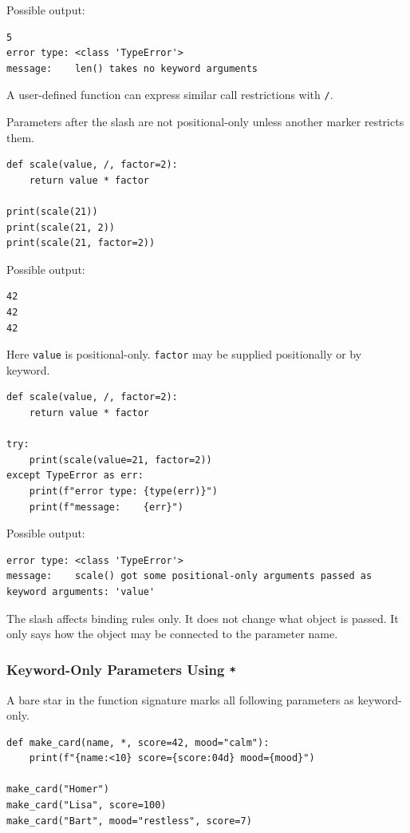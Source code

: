 Possible output:

\begin{verbatim}
5
error type: <class 'TypeError'>
message:    len() takes no keyword arguments
\end{verbatim}

A user-defined function can express similar call restrictions with \texttt{/}.

Parameters after the slash are not positional-only unless another marker restricts them.

\begin{verbatim}
def scale(value, /, factor=2):
    return value * factor

print(scale(21))
print(scale(21, 2))
print(scale(21, factor=2))
\end{verbatim}

Possible output:

\begin{verbatim}
42
42
42
\end{verbatim}

Here \texttt{value} is positional-only. \texttt{factor} may be supplied positionally or by keyword.

\begin{verbatim}
def scale(value, /, factor=2):
    return value * factor

try:
    print(scale(value=21, factor=2))
except TypeError as err:
    print(f"error type: {type(err)}")
    print(f"message:    {err}")
\end{verbatim}

Possible output:

\begin{verbatim}
error type: <class 'TypeError'>
message:    scale() got some positional-only arguments passed as keyword arguments: 'value'
\end{verbatim}

The slash affects binding rules only. It does not change what object is passed. It only says how the object may be connected to the parameter name.

\subsubsection{Keyword-Only Parameters Using \texttt{*}}

A bare star in the function signature marks all following parameters as keyword-only.

\begin{verbatim}
def make_card(name, *, score=42, mood="calm"):
    print(f"{name:<10} score={score:04d} mood={mood}")

make_card("Homer")
make_card("Lisa", score=100)
make_card("Bart", mood="restless", score=7)
\end{verbatim}

